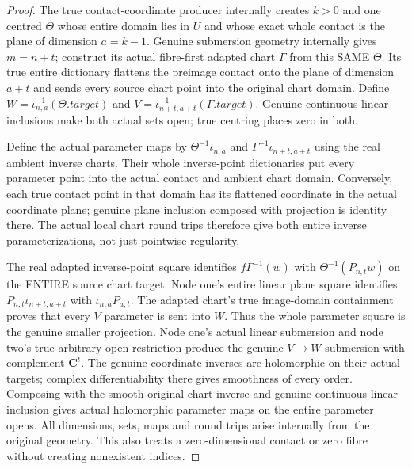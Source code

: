 \begin{proof}
The true contact-coordinate producer internally creates $k>0$ and one
centred $\Theta$ whose entire domain lies in $U$ and whose exact whole contact
is the plane of dimension $a=k-1$. Genuine submersion geometry internally
gives $m=n+t$; construct its actual fibre-first adapted chart $\Gamma$ from
this SAME $\Theta$. Its true entire dictionary flattens the preimage contact
onto the plane of dimension $a+t$ and sends every source chart point into
the original chart domain. Define $W=\iota_{n,a}^{-1}(\Theta.target)$ and
$V=\iota_{n+t,a+t}^{-1}(\Gamma.target)$. Genuine continuous linear inclusions
make both actual sets open; true centring places zero in both.

Define the actual parameter maps by $\Theta^{-1}\iota_{n,a}$ and
$\Gamma^{-1}\iota_{n+t,a+t}$ using the real ambient inverse charts. Their whole
inverse-point dictionaries put every parameter point into the actual contact
and ambient chart domain. Conversely, each true contact point in that domain
has its flattened coordinate in the actual coordinate plane; genuine plane
inclusion composed with projection is identity there. The actual local chart
round trips therefore give both entire inverse parameterizations, not just
pointwise regularity.

The real adapted inverse-point square identifies $f\Gamma^{-1}(w)$ with
$\Theta^{-1}(P_{n,t}w)$ on the ENTIRE source chart target. Node one's entire
linear plane square identifies $P_{n,t}\iota_{n+t,a+t}$ with
$\iota_{n,a}P_{a,t}$. The adapted chart's true image-domain containment proves
that every $V$ parameter is sent into $W$. Thus the whole parameter square is
the genuine smaller projection. Node one's actual linear submersion and node
two's true arbitrary-open restriction produce the genuine $V\to W$
submersion with complement $\mathbf C^t$. The genuine coordinate inverses are holomorphic on their actual targets; complex differentiability there gives smoothness of every order. Composing with the smooth original chart inverse and genuine continuous linear inclusion gives actual holomorphic parameter maps on the entire parameter opens. All dimensions, sets, maps and
round trips arise internally from the original geometry. This also treats a
zero-dimensional contact or zero fibre without creating nonexistent indices.
\end{proof}

